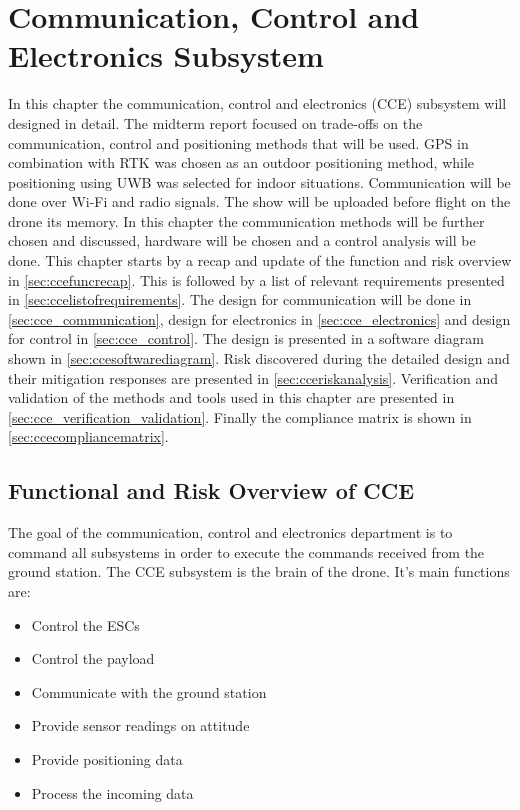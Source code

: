 \chapter{Communication, Control and Electronics Subsystem}
\label{ch:cce}




In this chapter the communication, control and electronics (CCE) subsystem will designed in detail. The midterm report focused on trade-offs on the communication, control and positioning methods that will be used. GPS in combination with RTK was chosen as an outdoor positioning method, while positioning using UWB was selected for indoor situations. Communication will be done over Wi-Fi and radio signals. The show will be uploaded before flight on the drone its memory. In this chapter the communication methods will be further chosen and discussed, hardware will be chosen and a control analysis will be done. This chapter starts by a recap and update of the function and risk overview in \autoref{sec:ccefuncrecap}. This is followed by a list of relevant requirements presented in \autoref{sec:ccelistofrequirements}. The design for communication will be done in \autoref{sec:cce_communication}, design for electronics in \autoref{sec:cce_electronics} and design for control in \autoref{sec:cce_control}. The design is presented in a software diagram shown in \autoref{sec:ccesoftwarediagram}. Risk discovered during the detailed design and their mitigation responses are presented in \autoref{sec:cceriskanalysis}. Verification and validation of the methods and tools used in this chapter are presented in \autoref{sec:cce_verification_validation}. Finally the compliance matrix is shown in \autoref{sec:ccecompliancematrix}.

\section{Functional and Risk Overview of CCE}
\label{sec:ccefuncrecap}
The goal of the communication, control and electronics department is to command all subsystems in order to execute the commands received from the ground station. The CCE subsystem is the brain of the drone. It's main functions are:
\begin{itemize}[noitemsep,nolistsep]
    \item Control the ESCs
    \item Control the payload
    \item Communicate with the ground station
    \item Provide sensor readings on attitude
    \item Provide positioning data
    \item Process the incoming data
\end{itemize}


